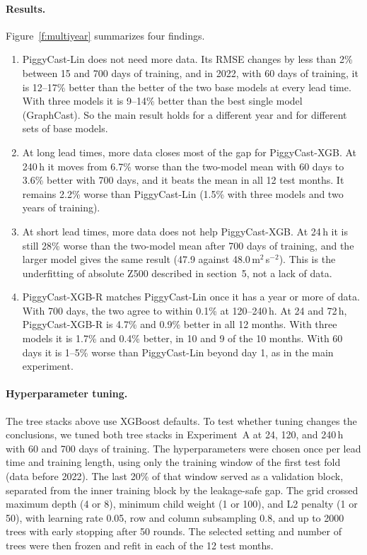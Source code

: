 \documentclass[twocol]{ametsocV6.1}
\newcommand{\units}{m$^{2}$\,s$^{-2}$}
\newcommand{\Zfive}{Z500}
\newcommand{\PCLin}{PiggyCast-Lin}
\newcommand{\PCXGB}{PiggyCast-XGB}
\newcommand{\PCXGBR}{PiggyCast-XGB-R}
\begin{document}
\paragraph{Results.} Figure~\ref{f:multiyear} summarizes four findings.
\begin{enumerate}
\item \PCLin{} does not need more data. Its RMSE changes by less than 2\% between 15 and 700 days of training, and in 2022, with 60 days of training, it is 12--17\% better than the better of the two base models at every lead time. With three models it is 9--14\% better than the best single model (GraphCast). So the main result holds for a different year and for different sets of base models.
\item At long lead times, more data closes most of the gap for \PCXGB{}. At 240\,h it moves from 6.7\% worse than the two-model mean with 60 days to 3.6\% better with 700 days, and it beats the mean in all 12 test months. It remains 2.2\% worse than \PCLin{} (1.5\% with three models and two years of training).
\item At short lead times, more data does not help \PCXGB{}. At 24\,h it is still 28\% worse than the two-model mean after 700 days of training, and the larger model gives the same result (47.9 against 48.0\,\units{}). This is the underfitting of absolute \Zfive{} described in section~5, not a lack of data.
\item \PCXGBR{} matches \PCLin{} once it has a year or more of data. With 700 days, the two agree to within 0.1\% at 120--240\,h. At 24 and 72\,h, \PCXGBR{} is 4.7\% and 0.9\% better in all 12 months. With three models it is 1.7\% and 0.4\% better, in 10 and 9 of the 10 months. With 60 days it is 1--5\% worse than \PCLin{} beyond day 1, as in the main experiment.
\end{enumerate}

\paragraph{Hyperparameter tuning.} The tree stacks above use XGBoost defaults. To test whether tuning changes the conclusions, we tuned both tree stacks in Experiment~A at 24, 120, and 240\,h with 60 and 700 days of training. The hyperparameters were chosen once per lead time and training length, using only the training window of the first test fold (data before 2022). The last 20\% of that window served as a validation block, separated from the inner training block by the leakage-safe gap. The grid crossed maximum depth (4 or 8), minimum child weight (1 or 100), and L2 penalty (1 or 50), with learning rate 0.05, row and column subsampling 0.8, and up to 2000 trees with early stopping after 50 rounds. The selected setting and number of trees were then frozen and refit in each of the 12 test months.
\end{document}
